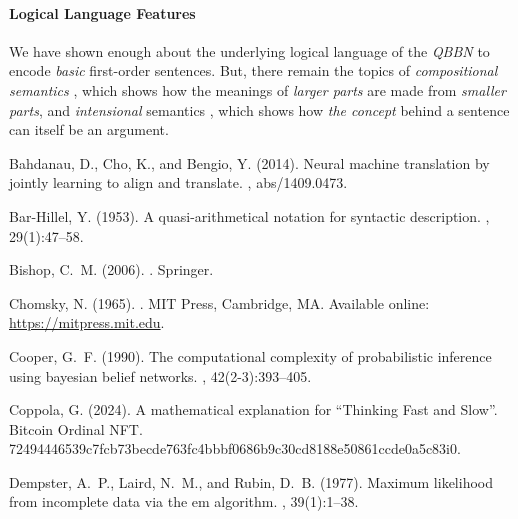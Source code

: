 \documentclass[11pt]{article}
\begin{document}
\paragraph{Logical Language Features}
We have shown enough about the underlying logical language of the {\em QBBN} to encode {\em basic} first-order sentences.
But, there remain the topics of {\em compositional semantics} \cite{montague1970universal}, which shows how the meanings of {\em larger parts} are made from {\em smaller parts}, and {\em intensional} semantics \cite{montague1973proper}, which shows how {\em the concept} behind a sentence can itself be an argument.
% 
% 
\begin{thebibliography}{}

    Bahdanau, D., Cho, K., and Bengio, Y. (2014).
    \newblock Neural machine translation by jointly learning to align and
      translate.
    , abs/1409.0473.
    
    Bar-Hillel, Y. (1953).
    \newblock A quasi-arithmetical notation for syntactic description.
    , 29(1):47--58.
    
    Bishop, C.~M. (2006).
    .
    \newblock Springer.
    
    Chomsky, N. (1965).
    .
    \newblock MIT Press, Cambridge, MA.
    \newblock Available online: \url{https://mitpress.mit.edu}.
    
    Cooper, G.~F. (1990).
    \newblock The computational complexity of probabilistic inference using
      bayesian belief networks.
    , 42(2-3):393--405.
    
    Coppola, G. (2024).
    \newblock A mathematical explanation for ``{Thinking Fast and Slow}''.
    \newblock Bitcoin Ordinal NFT.
    \newblock 72494446539c7fcb73becde763fc4bbbf0686b9c30cd8188e50861ccde0a5c83i0.
    
    Dempster, A.~P., Laird, N.~M., and Rubin, D.~B. (1977).
    \newblock Maximum likelihood from incomplete data via the em algorithm.
    , 39(1):1--38.
    

\end{thebibliography}
\end{document}
